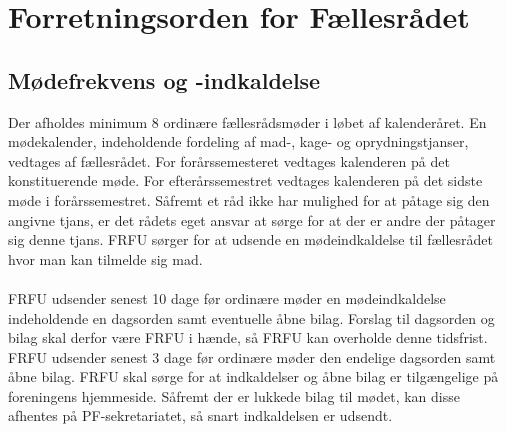 \section{Forretningsorden for Fællesrådet}

\subsection{Mødefrekvens og -indkaldelse}
Der afholdes minimum 8 ordinære fællesrådsmøder i løbet af kalenderåret. En mødekalender, indeholdende fordeling af mad-, kage- og oprydningstjanser, vedtages af fællesrådet. For forårssemesteret vedtages kalenderen på det konstituerende møde. For efterårssemestret vedtages kalenderen på det sidste møde i forårssemestret. Såfremt et råd ikke har mulighed for at påtage sig den angivne tjans, er det rådets eget ansvar at sørge for at der er andre der påtager sig denne tjans. FRFU sørger for at udsende en mødeindkaldelse til fællesrådet hvor man kan tilmelde sig mad.\\
\\
FRFU udsender senest 10 dage før ordinære møder en mødeindkaldelse indeholdende en dagsorden samt eventuelle åbne
bilag. Forslag til dagsorden og bilag skal derfor være FRFU i hænde, så FRFU kan overholde denne tidsfrist. FRFU udsender senest 3 dage før ordinære møder den endelige dagsorden samt åbne bilag. FRFU skal sørge for at indkaldelser og åbne bilag er tilgængelige på foreningens hjemmeside. Såfremt der er lukkede bilag til mødet, kan disse afhentes på PF-sekretariatet, så snart indkaldelsen er udsendt.
\\
\\

